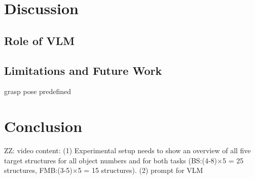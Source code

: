 \documentclass[letterpaper, 10 pt, conference]{ieeeconf}  %
\newcommand{\zz}[1]{{\color{red}ZZ: #1}}
\begin{document}
\section{Discussion}



\subsection{Role of VLM}


\subsection{Limitations and Future Work}

grasp pose predefined

\section{Conclusion}





\zz{video content: (1) Experimental setup needs to show an overview of all five target structures for all object numbers and for both tasks (BS:(4-8)$\times$5 = 25 structures, FMB:(3-5)$\times$5 = 15 structures). (2) prompt for VLM }

\addtolength{\textheight}{-12cm}   %






\end{document}
